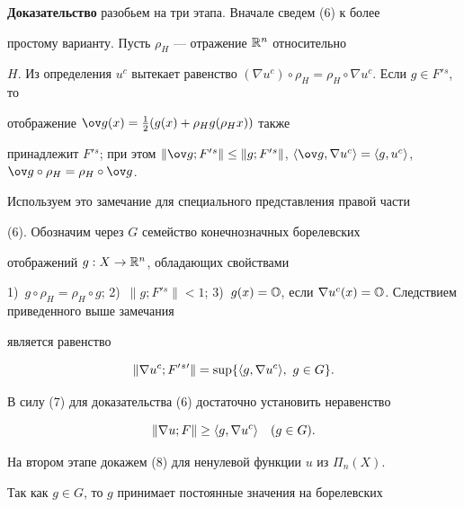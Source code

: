  


{\bf Доказательство} разобьем на три этапа. Вначале сведем (6) к более 


простому варианту. Пусть $\rho_H$ --- отражение $\Bbb R^n$ относительно 


$H$. Из определения $u^c$ вытекает равенство $(\nabla 


u^c)\circ\rho_H=\rho_H\circ\nabla u^c$. Если $g\in F{}'{}^s$, то 


отображение $\ov g(x)=\frac{1}{2}(g(x)+\rho_H g(\rho_H x))$ также 


принадлежит $F{}'{}^s$; при этом $\|\ov g;F{}'{}^s\|\le 


\|g;F{}'{}^s\|$, $\la\ov g,\nabla u^c\ra=\la g, u^c\ra$, $\ov 


g\circ\rho_H=\rho_H\circ\ov g$. 


 


Используем это замечание для специального представления правой части 


(6). Обозначим через $G$ семейство конечнозначных борелевских 


отображений $g:X\to\Bbb R^n$, обладающих свойствами 


1)~$g\circ\rho_H=\rho_H\circ g$; 2)~$\|g;F{}'{}^s\|<1$; 3)~$g(x)=\Bbb 


O$, если $\nabla u^c(x)=\Bbb O$. Следствием приведенного выше замечания 


является равенство 


\begin{equation} 


\|\nabla u^c;F{}'{}^s{}'\|=\sup\{\la g,\nabla u^c\ra, 


\ g\in G\}. 


\end{equation} 


В силу (7) для доказательства (6) достаточно установить неравенство 


\begin{equation} 


\|\nabla u;F\|\ge\la g,\nabla u^c\ra\quad (g\in G). 


\end{equation} 


 


На втором этапе докажем (8) для ненулевой функции $u$ из $\Pi_n(X)$. 


Так как $g\in G$, то $g$ принимает постоянные значения на борелевских 



